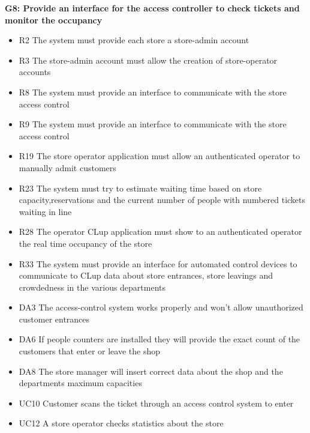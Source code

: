 \vfill
\pagebreak

\textbf{G8: Provide an interface for the access controller to check tickets and monitor the occupancy }
\begin{itemize}[label=\textcolor{clup_blue2}{\textbullet}]
    \item R2 The system must provide each store a store-admin account
    \item R3 The store-admin account must allow the creation of store-operator accounts
    \item R8 The system must provide an interface to communicate with the store access control
    \item R9 The system must provide an interface to communicate with the store access control
    \item R19 The store operator application must allow an authenticated operator to manually admit customers
    \item R23 The system must try to estimate waiting time based on store capacity,reservations and the current number of people with numbered tickets waiting in line
    \item R28 The operator CLup application must show to an authenticated operator the real time occupancy of the store
    \item R33 The system must provide an interface for automated control devices to communicate to CLup data about store entrances, store leavings and crowdedness in the various departments
\end{itemize}
\begin{itemize}[label=\textcolor{clup_red}{\textbullet}]
    \item DA3 The access-control system works properly and won’t allow unauthorized customer entrances
    \item DA6 If people counters are installed they will provide the exact count of the customers that enter or leave the shop
    \item DA8 The store manager will insert correct data about the shop and the departments maximum capacities
\end{itemize}
\begin{itemize}[label=\textcolor{clup_yellow}{\textbullet}]
    \item UC10 Customer scans the ticket through an access control system to enter
    \item UC12 A store operator checks statistics about the store
\end{itemize}

